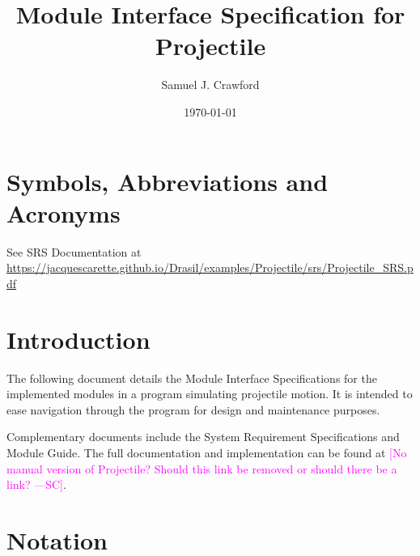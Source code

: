 \documentclass[12pt, titlepage]{article}
\newcommand{\authornote}[3]{\textcolor{#1}{[#3 ---#2]}}
\newcommand{\authornote}[3]{}
\newcommand{\sam}[1]{\authornote{magenta}{SC}{#1}}
\begin{document}
\title{Module Interface Specification for Projectile}

\author{Samuel J. Crawford}

\date{\today}

\maketitle


\newpage

\tableofcontents

\newpage

\section{Symbols, Abbreviations and Acronyms}

See SRS Documentation at \url{https://jacquescarette.github.io/Drasil/examples/Projectile/srs/Projectile_SRS.pdf}


\section{Introduction}

The following document details the Module Interface Specifications for the
implemented modules in a program simulating projectile motion. It is intended to 
ease navigation through the program for design and maintenance purposes.

Complementary documents include the System Requirement Specifications
and Module Guide.  The full documentation and implementation can be
found at \sam{No manual version of Projectile? Should this link be removed or  should there be a link?}.


\section{Notation}
\end{document}
